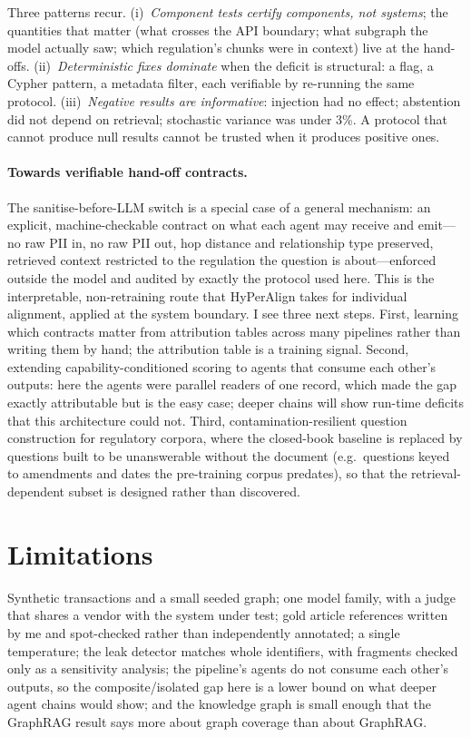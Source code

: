 \documentclass[10pt,twocolumn]{article}
\begin{document}
Three patterns recur. (i)~\emph{Component tests certify components, not systems}; the quantities that matter (what crosses the API boundary; what subgraph the model actually saw; which regulation's chunks were in context) live at the hand-offs. (ii)~\emph{Deterministic fixes dominate} when the deficit is structural: a flag, a Cypher pattern, a metadata filter, each verifiable by re-running the same protocol. (iii)~\emph{Negative results are informative}: injection had no effect; abstention did not depend on retrieval; stochastic variance was under 3\%. A protocol that cannot produce null results cannot be trusted when it produces positive ones.

\paragraph{Towards verifiable hand-off contracts.}
The sanitise-before-LLM switch is a special case of a general mechanism: an explicit, machine-checkable contract on what each agent may receive and emit---no raw PII in, no raw PII out, hop distance and relationship type preserved, retrieved context restricted to the regulation the question is about---enforced outside the model and audited by exactly the protocol used here. This is the interpretable, non-retraining route that HyPerAlign \citep{garbacea2025hyperalign} takes for individual alignment, applied at the system boundary. I see three next steps. First, learning which contracts matter from attribution tables across many pipelines rather than writing them by hand; the attribution table is a training signal. Second, extending capability-conditioned scoring to agents that consume each other's outputs: here the agents were parallel readers of one record, which made the gap exactly attributable but is the easy case; deeper chains will show run-time deficits that this architecture could not. Third, contamination-resilient question construction for regulatory corpora, where the closed-book baseline is replaced by questions built to be unanswerable without the document (e.g.\ questions keyed to amendments and dates the pre-training corpus predates), so that the retrieval-dependent subset is designed rather than discovered.

\section{Limitations}
Synthetic transactions and a small seeded graph; one model family, with a judge that shares a vendor with the system under test; gold article references written by me and spot-checked rather than independently annotated; a single temperature; the leak detector matches whole identifiers, with fragments checked only as a sensitivity analysis; the pipeline's agents do not consume each other's outputs, so the composite/isolated gap here is a lower bound on what deeper agent chains would show; and the knowledge graph is small enough that the GraphRAG result says more about graph coverage than about GraphRAG.
\end{document}
